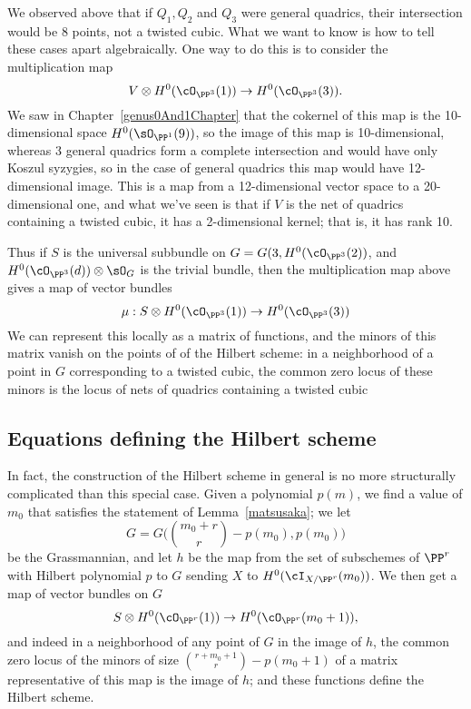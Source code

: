We observed above that if $Q_1, Q_2$ and $Q_3$ were general quadrics, their intersection would be
8 points,  not a twisted cubic. What we want to know is how to tell these cases apart algebraically. One way to do this is to consider the multiplication map
$$
V \otimes H^0(\cO_{\PP^3}(1)) \to H^0(\cO_{\PP^3}(3)).
$$
We saw in Chapter~\ref{genus0And1Chapter} that the cokernel of this map is the 10-dimensional space $H^0(\sO_{\PP^1}(9))$, so the image of this map is 10-dimensional, whereas
3 general quadrics form a complete intersection and would have only Koszul syzygies, so
in the case of general quadrics this map would have 12-dimensional image.
This is a map from a 12-dimensional vector space to a 20-dimensional one, and what we've seen is that if $V$ is the net of quadrics containing a twisted cubic, it has a 2-dimensional kernel; that is, it has rank 10. 

Thus if $S$ is the universal subbundle on $G = G(3, H^0(\cO_{\PP^3}(2))$, and  $H^0(\cO_{\PP^3}(d))\otimes \sO_G$ is the trivial bundle, then the multiplication map above gives a map of vector bundles
$$
\mu: S \otimes H^0(\cO_{\PP^3}(1)) \to H^0(\cO_{\PP^3}(3))
$$
We can represent this locally as a matrix of functions, and the minors of this matrix vanish on the points of
of the Hilbert scheme: in a neighborhood of a point in $G$ corresponding to a twisted cubic, the common zero locus of these minors is the locus of nets of quadrics containing a twisted cubic

\subsection{Equations defining the Hilbert scheme}\label{eqns of Hilb}

In fact, the construction of the Hilbert scheme in general is no more structurally complicated than this special case. Given a polynomial $p(m)$, we find a value of $m_0$ that satisfies the statement of Lemma~\ref{matsusaka}; we let
$$
G = G\big(\binom{m_0+r}{r} - p(m_0), p(m_0)\big)
$$
be the Grassmannian, and let $h$ be the map from the set of subschemes of $\PP^r$ with Hilbert polynomial $p$ to $G$ sending $X$ to $H^0(\cI_{X/\PP^r}(m_0))$. We then get a map of vector bundles  on $G$
$$
S \otimes H^0(\cO_{\PP^r}(1)) \to H^0(\cO_{\PP^r}(m_0+1)),
$$
and indeed in a neighborhood of any point of $G$ in the image of $h$, the common zero locus of the minors of size $\binom{r+m_0+1}{r} - p(m_0+1)$ of a matrix representative of this map is the image of $h$; and these functions define the Hilbert scheme.

